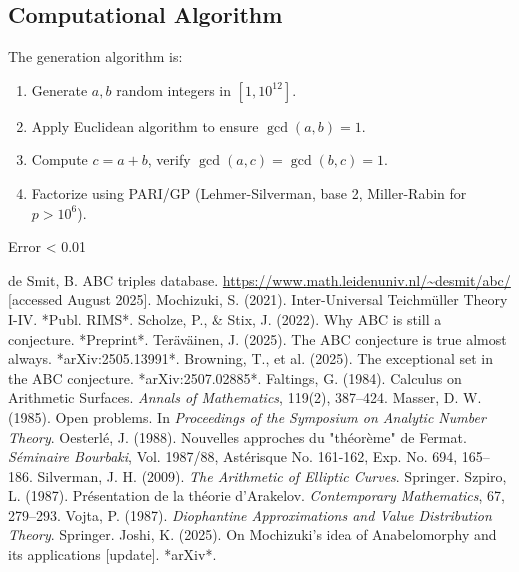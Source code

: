 \documentclass[11pt,a4paper]{article}
\begin{document}
\subsection{Computational Algorithm}
The generation algorithm is:
\begin{enumerate}
    \item Generate \(a, b\) random integers in \([1, 10^{12}]\).
    \item Apply Euclidean algorithm to ensure \(\gcd(a,b)=1\).
    \item Compute \(c = a + b\), verify \(\gcd(a,c)=\gcd(b,c)=1\).
    \item Factorize using PARI/GP (Lehmer-Silverman, base 2, Miller-Rabin for \(p > 10^6\)).
\end{enumerate}
Error < 0.01%

\begin{thebibliography}{30}
 de Smit, B. ABC triples database. \url{https://www.math.leidenuniv.nl/~desmit/abc/} [accessed August 2025].
 Mochizuki, S. (2021). Inter-Universal Teichmüller Theory I-IV. *Publ. RIMS*.
 Scholze, P., \& Stix, J. (2022). Why ABC is still a conjecture. *Preprint*.
 Teräväinen, J. (2025). The ABC conjecture is true almost always. *arXiv:2505.13991*.
 Browning, T., et al. (2025). The exceptional set in the ABC conjecture. *arXiv:2507.02885*.
 Faltings, G. (1984). Calculus on Arithmetic Surfaces. \textit{Annals of Mathematics}, 119(2), 387--424.
 Masser, D. W. (1985). Open problems. In \textit{Proceedings of the Symposium on Analytic Number Theory}.
 Oesterlé, J. (1988). Nouvelles approches du "théorème" de Fermat. \textit{Séminaire Bourbaki}, Vol. 1987/88, Astérisque No. 161-162, Exp. No. 694, 165--186.
 Silverman, J. H. (2009). \textit{The Arithmetic of Elliptic Curves}. Springer.
 Szpiro, L. (1987). Présentation de la théorie d'Arakelov. \textit{Contemporary Mathematics}, 67, 279--293.
 Vojta, P. (1987). \textit{Diophantine Approximations and Value Distribution Theory}. Springer.
 Joshi, K. (2025). On Mochizuki's idea of Anabelomorphy and its applications [update]. *arXiv*.
\end{thebibliography}
\end{document}
